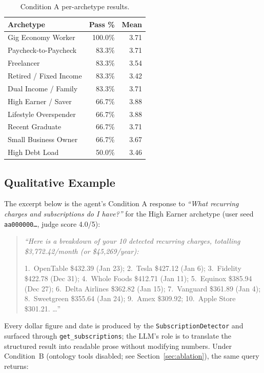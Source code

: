 \documentclass[conference]{IEEEtran}
\begin{document}
\begin{table}[t]
\centering
\caption{Condition A per-archetype results.}
\label{tab:a_arch}
\begin{tabular}{@{}lrr@{}}
\toprule
Archetype & Pass \% & Mean \\
\midrule
Gig Economy Worker & 100.0\% & 3.71 \\
Paycheck-to-Paycheck & 83.3\% & 3.71 \\
Freelancer & 83.3\% & 3.54 \\
Retired / Fixed Income & 83.3\% & 3.42 \\
Dual Income / Family & 83.3\% & 3.71 \\
High Earner / Saver & 66.7\% & 3.88 \\
Lifestyle Overspender & 66.7\% & 3.88 \\
Recent Graduate & 66.7\% & 3.71 \\
Small Business Owner & 66.7\% & 3.67 \\
High Debt Load & 50.0\% & 3.46 \\
\bottomrule
\end{tabular}
\end{table}

\subsection{Qualitative Example}

The excerpt below is the agent's Condition A response to
\emph{``What recurring charges and subscriptions do I have?''} for
the High Earner archetype (user seed \texttt{aa000000\ldots}, judge
score 4.0/5):

\begin{quote}\small\itshape
``Here is a breakdown of your 10 detected recurring charges,
totalling \$3{,}772.42/month (or \$45{,}269/year):

\hspace{1em}1.~OpenTable \$432.39 (Jan 23); 2.~Tesla \$427.12
(Jan 6); 3.~Fidelity \$422.78 (Dec 31); 4.~Whole Foods \$412.71
(Jan 11); 5.~Equinox \$385.94 (Dec 27); 6.~Delta Airlines
\$362.82 (Jan 15); 7.~Vanguard \$361.89 (Jan 4); 8.~Sweetgreen
\$355.64 (Jan 24); 9.~Amex \$309.92; 10.~Apple Store \$301.21.
\ldots''
\end{quote}

Every dollar figure and date is produced by the
\texttt{SubscriptionDetector} and surfaced through
\texttt{get\_subscriptions}; the LLM's role is to translate the
structured result into readable prose without modifying numbers.
Under Condition~B (ontology tools disabled; see
Section~\ref{sec:ablation}), the same query returns:
\end{document}
